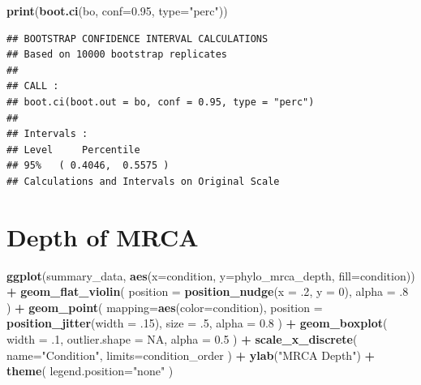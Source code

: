 \documentclass[]{book}
\newenvironment{Shaded}{\begin{snugshade}}{\end{snugshade}}
\newcommand{\DataTypeTok}[1]{\textcolor[rgb]{0.13,0.29,0.53}{#1}}
\newcommand{\DecValTok}[1]{\textcolor[rgb]{0.00,0.00,0.81}{#1}}
\newcommand{\FloatTok}[1]{\textcolor[rgb]{0.00,0.00,0.81}{#1}}
\newcommand{\KeywordTok}[1]{\textcolor[rgb]{0.13,0.29,0.53}{\textbf{#1}}}
\newcommand{\NormalTok}[1]{#1}
\newcommand{\OperatorTok}[1]{\textcolor[rgb]{0.81,0.36,0.00}{\textbf{#1}}}
\newcommand{\OtherTok}[1]{\textcolor[rgb]{0.56,0.35,0.01}{#1}}
\newcommand{\StringTok}[1]{\textcolor[rgb]{0.31,0.60,0.02}{#1}}
\begin{document}
\begin{Shaded}
\begin{Highlighting}[]
\KeywordTok{print}\NormalTok{(}\KeywordTok{boot.ci}\NormalTok{(bo, }\DataTypeTok{conf=}\FloatTok{0.95}\NormalTok{, }\DataTypeTok{type=}\StringTok{"perc"}\NormalTok{))}
\end{Highlighting}
\end{Shaded}

\begin{verbatim}
## BOOTSTRAP CONFIDENCE INTERVAL CALCULATIONS
## Based on 10000 bootstrap replicates
## 
## CALL : 
## boot.ci(boot.out = bo, conf = 0.95, type = "perc")
## 
## Intervals : 
## Level     Percentile     
## 95%   ( 0.4046,  0.5575 )  
## Calculations and Intervals on Original Scale
\end{verbatim}

\hypertarget{depth-of-mrca}{%
\section{Depth of MRCA}\label{depth-of-mrca}}

\begin{Shaded}
\begin{Highlighting}[]
\KeywordTok{ggplot}\NormalTok{(summary_data, }\KeywordTok{aes}\NormalTok{(}\DataTypeTok{x=}\NormalTok{condition, }\DataTypeTok{y=}\NormalTok{phylo_mrca_depth, }\DataTypeTok{fill=}\NormalTok{condition)) }\OperatorTok{+}
\StringTok{  }\KeywordTok{geom_flat_violin}\NormalTok{(}
    \DataTypeTok{position =} \KeywordTok{position_nudge}\NormalTok{(}\DataTypeTok{x =} \FloatTok{.2}\NormalTok{, }\DataTypeTok{y =} \DecValTok{0}\NormalTok{),}
    \DataTypeTok{alpha =} \FloatTok{.8}
\NormalTok{  ) }\OperatorTok{+}
\StringTok{  }\KeywordTok{geom_point}\NormalTok{(}
    \DataTypeTok{mapping=}\KeywordTok{aes}\NormalTok{(}\DataTypeTok{color=}\NormalTok{condition),}
    \DataTypeTok{position =} \KeywordTok{position_jitter}\NormalTok{(}\DataTypeTok{width =} \FloatTok{.15}\NormalTok{),}
    \DataTypeTok{size =} \FloatTok{.5}\NormalTok{,}
    \DataTypeTok{alpha =} \FloatTok{0.8}
\NormalTok{  ) }\OperatorTok{+}
\StringTok{  }\KeywordTok{geom_boxplot}\NormalTok{(}
    \DataTypeTok{width =} \FloatTok{.1}\NormalTok{,}
    \DataTypeTok{outlier.shape =} \OtherTok{NA}\NormalTok{,}
    \DataTypeTok{alpha =} \FloatTok{0.5}
\NormalTok{  ) }\OperatorTok{+}
\StringTok{  }\KeywordTok{scale_x_discrete}\NormalTok{(}
    \DataTypeTok{name=}\StringTok{"Condition"}\NormalTok{,}
    \DataTypeTok{limits=}\NormalTok{condition_order}
\NormalTok{  ) }\OperatorTok{+}
\StringTok{  }\KeywordTok{ylab}\NormalTok{(}\StringTok{"MRCA Depth"}\NormalTok{) }\OperatorTok{+}
\StringTok{  }\KeywordTok{theme}\NormalTok{(}
    \DataTypeTok{legend.position=}\StringTok{"none"}
\NormalTok{  )}
\end{Highlighting}
\end{Shaded}
\end{document}
